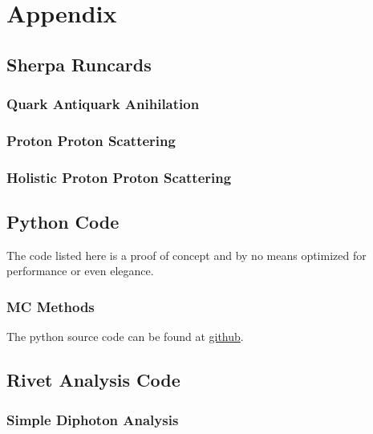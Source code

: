 \chapter{Appendix}%
\label{chap:appendix}

\section{Sherpa Runcards}%
\label{sec:runcards}

\subsection{Quark Antiquark Anihilation}%
\label{sec:qqggruncard}

\subsection{Proton Proton Scattering}%
\label{sec:ppruncard}

\subsection{Holistic Proton Proton Scattering}%
\label{sec:ppruncardfull}


\section{Python Code}%
\label{sec:pycode}
The code listed here is a proof of concept and by no means optimized
for performance or even elegance.

\subsection{MC Methods}%
\label{sec:mcpy}
The python source code can be found at
\href{https://github.com/vale981/bachelor_thesis/blob/master/prog/python/qqgg/monte_carlo.py}{github}.

\section{Rivet Analysis Code}%
\label{sec:rivetcode}

\subsection{Simple Diphoton Analysis}%
\label{sec:simpdiphotriv}

